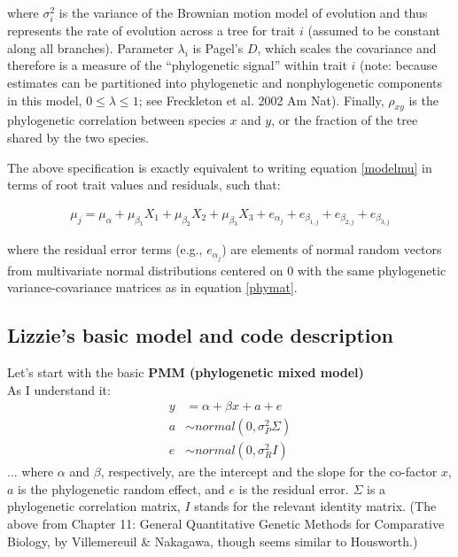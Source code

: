 \documentclass[12pt,a4paper]{article}
\begin{document}
\noindent where $\sigma_i^2$ is the variance of the Brownian motion model of evolution and thus represents the rate of evolution across a tree for trait $i$ (assumed to be constant along all branches). Parameter $\lambda_i$ is Pagel's $D$, which scales the covariance and therefore is a measure of the ``phylogenetic signal'' within trait $i$ (note: because estimates can be partitioned into phylogenetic and nonphylogenetic components in this model, $0 \leq \lambda \leq 1$; see Freckleton et al. 2002 Am Nat). Finally, $\rho_{xy}$ is the phylogenetic correlation between species $x$ and $y$, or the fraction of the tree shared by the two species.

The above specification is exactly equivalent to writing equation \ref{modelmu} in terms of root trait values and residuals, such that:

\begin{align}
  \mu_j = \mu_\alpha + \mu_{\beta_1} X_1 + \mu_{\beta_2} X_2 + \mu_{\beta_3} X_3 + e_{\alpha_{j}} + e_{\beta_{1,j}} + e_{\beta_{2,j}} + e_{\beta_{3,j}}
\end{align}

\noindent where the residual error terms (e.g., $e_{\alpha_{j}}$) are elements of normal random vectors from multivariate normal distributions centered on $0$ with the same phylogenetic variance-covariance matrices as in equation \ref{phymat}.

\newpage
\subsection*{Lizzie's basic model and code description} %

Let's start with the basic {\bf PMM (phylogenetic mixed model)} \\

As I understand it:
\begin{align}
y & = \alpha + \beta x + a + e\\
a & \sim normal(0, \sigma_P^2\Sigma)\\
e & \sim normal(0, \sigma_R^2I)
\end{align}
... where $\alpha$ and $\beta$, respectively, are the intercept and the slope for the co-factor $x$, $a$ is the phylogenetic random effect, and $e$ is the residual error. $\Sigma$ is a phylogenetic correlation matrix, $I$ stands for the relevant identity matrix. (The above from Chapter 11: General Quantitative Genetic Methods for Comparative Biology, by Villemereuil \& Nakagawa, though seems similar to Housworth.)\\
\end{document}
